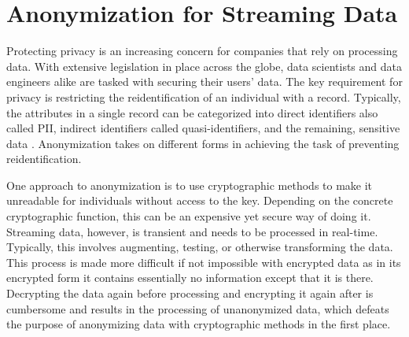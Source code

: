 \section{Anonymization for Streaming Data\label{sec:anon}\label{lit:data_streaming}}
Protecting privacy is an increasing concern for companies that rely on processing data. With extensive legislation in place across the globe, data scientists and data engineers alike are tasked with securing their users' data. The key requirement for privacy is restricting the reidentification of an individual with a record. Typically, the attributes in a single record can be categorized into direct identifiers also called \ac{PII}, indirect identifiers called quasi-identifiers, and the remaining, sensitive data \cite{gdpr_recital_26}. Anonymization takes on different forms in achieving the task of preventing reidentification. \par 

One approach to anonymization is to use cryptographic methods to make it unreadable for individuals without access to the key. Depending on the concrete cryptographic function, this can be an expensive yet secure way of doing it. Streaming data, however, is transient and needs to be processed in real-time. Typically, this involves augmenting, testing, or otherwise transforming the data. This process is made more difficult if not impossible with encrypted data as in its encrypted form it contains essentially no information except that it is there. Decrypting the data again before processing and encrypting it again after is cumbersome and results in the processing of unanonymized data, which defeats the purpose of anonymizing data with cryptographic methods in the first place. \par
 
